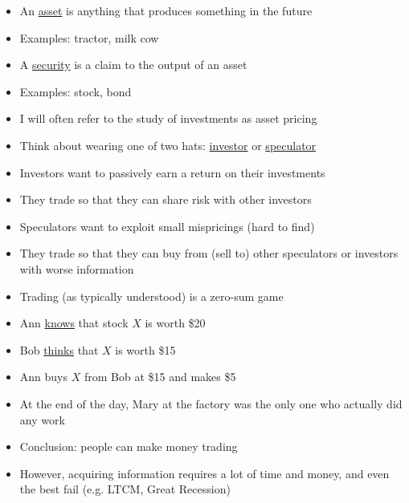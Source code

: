 \documentclass{beamer}
\begin{document}
\begin{frame}{}
	\begin{itemize}
		\item An \underline{asset} is anything that produces something in the future
		\item Examples: tractor, milk cow
		\item A \underline{security} is a claim to the output of an asset
		\item Examples: stock, bond
		\item I will often refer to the study of investments as asset pricing
	\end{itemize}
\end{frame}

\begin{frame}{}
	\begin{itemize}
		\item Think about wearing one of two hats:  \underline{investor} or \underline{speculator}
		\item Investors want to passively earn a return on their investments
		\item They trade so that they can share risk with other investors
		\item Speculators want to exploit small mispricings (hard to find)
		\item They trade so that they can buy from (sell to) other speculators or investors with worse information
	\end{itemize}
\end{frame}

\begin{frame}{}
	\begin{itemize}
		\item Trading (as typically understood) is a zero-sum game
		\item Ann \underline{knows} that stock $X$ is worth \$20
		\item Bob \underline{thinks} that $X$ is worth \$15
		\item Ann buys $X$ from Bob at \$15 and makes \$5
		\item At the end of the day, Mary at the factory was the only one who actually did any work
		\item Conclusion: people can make money trading
		\item However, acquiring information requires a lot of time and money, and even the best fail (e.g. LTCM, Great Recession)
	\end{itemize}
\end{frame}
\end{document}
